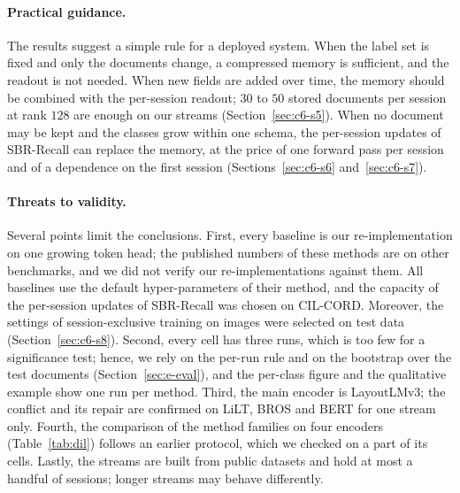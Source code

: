 \paragraph{Practical guidance.} The results suggest a simple rule for a deployed system.
When the label set is fixed and only the documents change, a compressed memory is
sufficient, and the readout is not needed. When new fields are added over time, the memory
should be combined with the per-session readout; $30$ to $50$ stored documents per session
at rank $128$ are enough on our streams (Section~\ref{sec:c6-s5}). When no document may be
kept and the classes grow within one schema, the per-session updates of SBR-Recall can
replace the memory, at the price of one forward pass per session and of a dependence on the
first session (Sections~\ref{sec:c6-s6} and~\ref{sec:c6-s7}).

\paragraph{Threats to validity.} Several points limit the conclusions. First, every
baseline is our re-implementation on one growing token head; the published numbers of
these methods are on other benchmarks, and we did not verify our re-implementations
against them. All baselines use the default hyper-parameters of their method, and the
capacity of the per-session updates of SBR-Recall was chosen on CIL-CORD. Moreover, the
settings of session-exclusive training on images were selected on test data
(Section~\ref{sec:c6-s8}). Second, every cell has three runs, which is
too few for a significance test; hence, we rely on the per-run rule and on the bootstrap
over the test documents (Section~\ref{sec:e-eval}), and the per-class figure and the qualitative
example show one run per method. Third, the main encoder is LayoutLMv3; the conflict and its repair are
confirmed on LiLT, BROS and BERT for one stream only. Fourth, the comparison of the method families on
four encoders (Table~\ref{tab:dil}) follows an earlier protocol, which we checked on a
part of its cells. Lastly, the streams are built from public datasets and hold at most a
handful of sessions; longer streams may behave differently.
